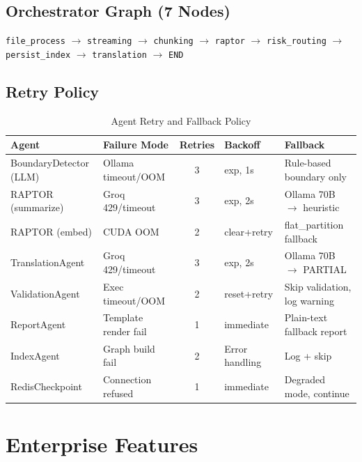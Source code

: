 \documentclass[11pt,a4paper]{article}
\begin{document}
\subsection{Orchestrator Graph (7 Nodes)}

\begin{infobox}
\small
\texttt{file\_process} $\longrightarrow$
\texttt{streaming} $\longrightarrow$
\texttt{chunking} $\longrightarrow$
\texttt{raptor} $\longrightarrow$
\texttt{risk\_routing} $\longrightarrow$
\texttt{persist\_index} $\longrightarrow$
\texttt{translation} $\longrightarrow$
\texttt{END}
\end{infobox}

\subsection{Retry Policy}

\begin{table}[H]
\centering
\caption{Agent Retry and Fallback Policy}
\renewcommand{\arraystretch}{1.25}
\small
\begin{tabularx}{\textwidth}{@{} l L{2.5cm} c l L{3.5cm} @{}}
\toprule
\textbf{Agent} & \textbf{Failure Mode} & \textbf{Retries} & \textbf{Backoff} & \textbf{Fallback} \\
\midrule
BoundaryDetector (LLM) & Ollama timeout/OOM & 3 & exp, 1s & Rule-based boundary only \\
RAPTOR (summarize) & Groq 429/timeout & 3 & exp, 2s & Ollama 70B $\to$ heuristic \\
RAPTOR (embed) & CUDA OOM & 2 & clear+retry & flat\_partition fallback \\
TranslationAgent & Groq 429/timeout & 3 & exp, 2s & Ollama 70B $\to$ PARTIAL \\
ValidationAgent & Exec timeout/OOM & 2 & reset+retry & Skip validation, log warning \\
ReportAgent & Template render fail & 1 & immediate & Plain-text fallback report \\
IndexAgent & Graph build fail & 2 & Error handling & Log + skip \\
RedisCheckpoint & Connection refused & 1 & immediate & Degraded mode, continue \\
\bottomrule
\end{tabularx}
\end{table}


\section{Enterprise Features}
\end{document}
